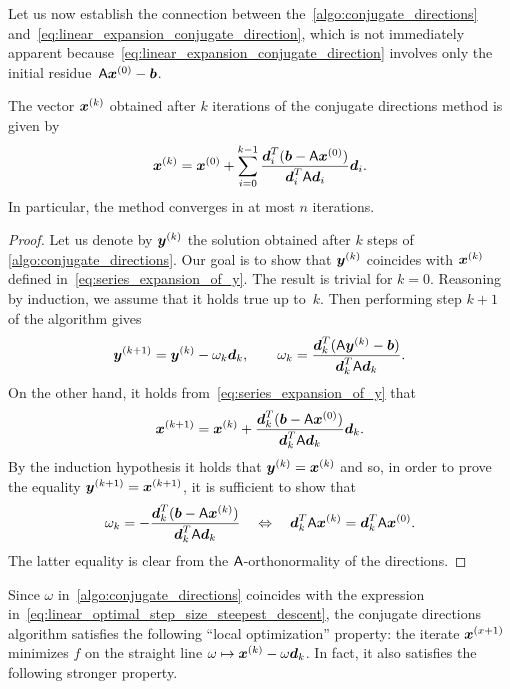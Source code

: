 Let us now establish the connection between the~\cref{algo:conjugate_directions} and~\eqref{eq:linear_expansion_conjugate_direction},
which is not immediately apparent because~\eqref{eq:linear_expansion_conjugate_direction} involves only the initial residue~$\mathsf A \mathbf{\boldsymbol{x}}^{(0)} - \mathbf{\boldsymbol{b}}$.
\begin{proposition}
    \label{proposition:conjugate_directions}
    The vector $\mathbf{\boldsymbol{x}}^{(k)}$ obtained after $k$ iterations of the conjugate directions method is given by
    \begin{equation}
        \label{eq:series_expansion_of_y}
        \mathbf{\boldsymbol{x}}^{(k)} = \mathbf{\boldsymbol{x}}^{(0)}
        + \sum_{i=0}^{k-1} \frac{\mathbf{\boldsymbol{d}}_i^T (\mathbf{\boldsymbol{b}} - \mathsf A \mathbf{\boldsymbol{x}}^{(0)})}{\mathbf{\boldsymbol{d}}_i^T \mathsf A \mathbf{\boldsymbol{d}}_i} \mathbf{\boldsymbol{d}}_i.
    \end{equation}
    In particular,
    the method converges in at most $n$ iterations.
\end{proposition}
\begin{proof}
    Let us denote by $\mathbf{\boldsymbol{y}}^{(k)}$ the solution obtained after $k$ steps of \cref{algo:conjugate_directions}.
    Our goal is to show that $\mathbf{\boldsymbol{y}}^{(k)}$ coincides with $\mathbf{\boldsymbol{x}}^{(k)}$ defined in~\eqref{eq:series_expansion_of_y}.
    The result is trivial for $k = 0$.
    Reasoning by induction,
    we assume that it holds true up to~$k$.
    Then performing step $k+1$ of the algorithm gives
    \[
        \mathbf{\boldsymbol{y}}^{(k+1)} = \mathbf{\boldsymbol{y}}^{(k)} - \omega_k \mathbf{\boldsymbol{d}}_k, \qquad \omega_k = \frac{\mathbf{\boldsymbol{d}}_k^T (\mathsf A \mathbf{\boldsymbol{y}}^{(k)} - \mathbf{\boldsymbol{b}})}{\mathbf{\boldsymbol{d}}_k^T \mathsf A \mathbf{\boldsymbol{d}}_k}.
    \]
    On the other hand,
    it holds from~\eqref{eq:series_expansion_of_y} that
    \[
        \mathbf{\boldsymbol{x}}^{(k+1)} = \mathbf{\boldsymbol{x}}^{(k)} + \frac{\mathbf{\boldsymbol{d}}_k^T (\mathbf{\boldsymbol{b}} - \mathsf A \mathbf{\boldsymbol{x}}^{(0)})}{\mathbf{\boldsymbol{d}}_k^T \mathsf A \mathbf{\boldsymbol{d}}_k} \mathbf{\boldsymbol{d}}_k.
    \]
    By the induction hypothesis it holds that $\mathbf{\boldsymbol{y}}^{(k)} = \mathbf{\boldsymbol{x}}^{(k)}$ and so,
    in order to prove the equality $\mathbf{\boldsymbol{y}}^{(k+1)} = \mathbf{\boldsymbol{x}}^{(k+1)}$,
    it is sufficient to show that
    \[
        \omega_k = - \frac{\mathbf{\boldsymbol{d}}_k^T (\mathbf{\boldsymbol{b}} - \mathsf A \mathbf{\boldsymbol{x}}^{(k)})}{\mathbf{\boldsymbol{d}}_k^T \mathsf A \mathbf{\boldsymbol{d}}_k}
        \quad \Leftrightarrow \quad
        \mathbf{\boldsymbol{d}}_k^T \mathsf A \mathbf{\boldsymbol{x}}^{(k)} = \mathbf{\boldsymbol{d}}_k^T \mathsf A \mathbf{\boldsymbol{x}}^{(0)}.
    \]
    The latter equality is clear from the $\mathsf A$-orthonormality of the directions.
\end{proof}

Since $\omega$ in~\cref{algo:conjugate_directions} coincides with the expression in~\eqref{eq:linear_optimal_step_size_steepest_descent},
the conjugate directions algorithm satisfies the following ``local optimization'' property:
the iterate $\mathbf{\boldsymbol{x}}^{(x+1)}$ minimizes $f$ on the straight line $\omega \mapsto \mathbf{\boldsymbol{x}}^{(k)} - \omega \mathbf{\boldsymbol{d}}_k$.
In fact, it also satisfies the following stronger property.

